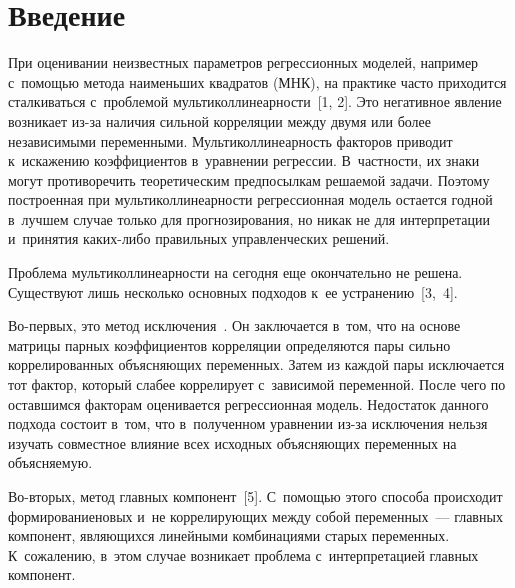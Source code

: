 



\thispagestyle{headings}

\begin{multicols}{2}

\label{st\stat}
  
\section{Введение}

  При оценивании неизвестных параметров регрессионных моделей, например 
с~по\-мощью метода наименьших квадратов (МНК), на практике часто 
приходится сталкиваться с~проблемой мультиколлинеарности~[1, 2]. Это 
негативное явление возникает из-за наличия сильной корреляции между двумя 
или более независимыми переменными. Мультиколлинеарность факторов 
приводит к~искажению коэффициентов в~уравнении регрессии. В~частности, их 
знаки могут противоречить теоретическим предпосылкам решаемой задачи. 
Поэтому построенная при мультиколлинеарности регрессионная модель остается 
годной в~лучшем случае только для прогнозирования, но никак не для 
интерпретации и~принятия ка\-ких-ли\-бо правильных управленческих решений.
  
  Проблема мультиколлинеарности на сегодня еще окончательно не решена. 
Существуют лишь несколько основных подходов к~ее устранению~[3,~4].
{

}
  
  Во-первых, это метод исключения~\cite{4-baz}. Он заключается в~том, что на 
основе матрицы парных коэффициентов корреляции определяются пары сильно 
коррелированных объясняющих переменных. Затем из каждой пары исключается 
тот фактор, который слабее коррелирует с~зависимой переменной. После чего по 
оставшимся факторам оценивается регрессионная модель. Недостаток данного 
подхода состоит в~том, что в~полученном уравнении из-за исключения нельзя 
изучать совместное влияние всех исходных объясняющих переменных на 
объясняемую.
  
  Во-вторых, метод главных компонент~[5]. С~помощью этого способа 
происходит формирование\linebreak новых и~не коррелирующих между собой 
переменных~--- главных компонент, являющихся линейными комбинациями 
старых переменных. К~сожалению, в~этом случае возникает проблема 
с~\mbox{интерпретацией} главных компонент.
  

\end{multicols}
